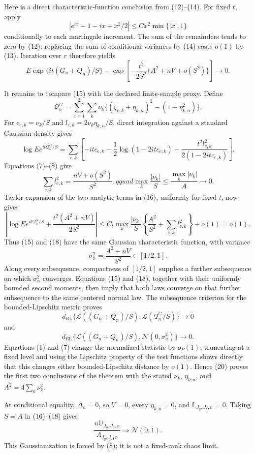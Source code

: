 Here is a direct characteristic-function conclusion from (12)--(14).  For fixed \(t\), apply
\[
|e^{ix}-1-ix+x^2/2|\le Cx^2\min\{|x|,1\}
\]
conditionally to each martingale increment.  The sum of the remainders tends to zero by (12); replacing the sum of conditional variances by (14) costs \(o(1)\) by (13).  Iteration over \(r\) therefore yields
\[
E\exp\{it(G_n+Q_n)/S\}
-\exp\left[-\frac{t^2}{2S^2}\{A^2+nV+o(S^2)\}\right]\longrightarrow0. \tag{15}
\]

It remains to compare (15) with the declared finite-sample proxy.  Define
\[
\mathcal Q_n^G=\sum_{e=1}^2\sum_k\nu_k
\{(\xi_{e,k}+\eta_{k,n})^2-(1+\eta_{k,n}^2)\}.
\]
For \(c_{e,k}=\nu_k/S\) and \(l_{e,k}=2\nu_k\eta_{k,n}/S\), direct integration against a standard Gaussian density gives
\[
\log E e^{it\mathcal Q_n^G/S}
=\sum_{e,k}\left[-itc_{e,k}-\frac12\log(1-2itc_{e,k})
-\frac{t^2l_{e,k}^2}{2(1-2itc_{e,k})}\right]. \tag{16}
\]
Equations (7)--(8) give
\[
\sum_{e,k}l_{e,k}^2=\frac{nV+o(S^2)}{S^2},qquad
\max_k\frac{|\nu_k|}{S}\le\frac{\max_k|\nu_k|}{A}\longrightarrow0. \tag{17}
\]
Taylor expansion of the two analytic terms in (16), uniformly for fixed \(t\), now gives
\[
\left|\log E e^{it\mathcal Q_n^G/S}
+\frac{t^2(A^2+nV)}{2S^2}\right|
\le C_t\max_k\frac{|\nu_k|}{S}
\left\{\frac{A^2}{S^2}+\sum_{e,k}l_{e,k}^2\right\}+o(1)=o(1). \tag{18}
\]
Thus (15) and (18) have the same Gaussian characteristic function, with variance
\[
\sigma_n^2=\frac{A^2+nV}{S^2}\in[1/2,1]. \tag{19}
\]
Along every subsequence, compactness of \([1/2,1]\) supplies a further subsequence on which \(\sigma_n^2\) converges.  Equations (15) and (18), together with their uniformly bounded second moments, then imply that both laws converge on that further subsequence to the same centered normal law.  The subsequence criterion for the bounded-Lipschitz metric proves
\[
d_{\mathrm{BL}}\{\mathcal L((G_n+Q_n)/S),\mathcal L(\mathcal Q_n^G/S)\}\to0
\]
and
\[
d_{\mathrm{BL}}\{\mathcal L((G_n+Q_n)/S),\mathcal N(0,\sigma_n^2)\}\to0. \tag{20}
\]
Equations (1) and (7) change the normalized statistic by \(o_P(1)\); truncating at a fixed level and using the Lipschitz property of the test functions shows directly that this changes either bounded-Lipschitz distance by \(o(1)\).  Hence (20) proves the first two conclusions of the theorem with the stated \(\nu_k\), \(\eta_{k,n}\), and \(A^2=4\sum_k\nu_k^2\).

At conditional equality, \(\Delta_n=0\), so \(V=0\), every \(\eta_{k,n}=0\), and \(\mathbb L_{J_y,J_z,n}=0\).  Taking \(S=A\) in (16)--(18) gives
\[
\frac{n\mathbb U_{J_y,J_z,n}}{A_{J_y,J_z,n}}\Rightarrow\mathcal N(0,1).
\]
This Gaussianization is forced by (8); it is not a fixed-rank chaos limit.

